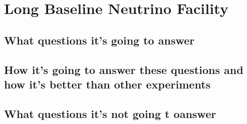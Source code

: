 \section{Long Baseline Neutrino Facility}
\subsection{What questions it's going to answer}
\subsection{How it's going to answer these questions and how it's better  than other experiments}
\subsection{What questions it's not going t oanswer}
